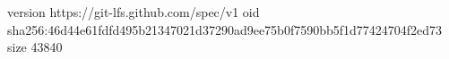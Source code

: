 version https://git-lfs.github.com/spec/v1
oid sha256:46d44e61fdfd495b21347021d37290ad9ee75b0f7590bb5f1d77424704f2ed73
size 43840
